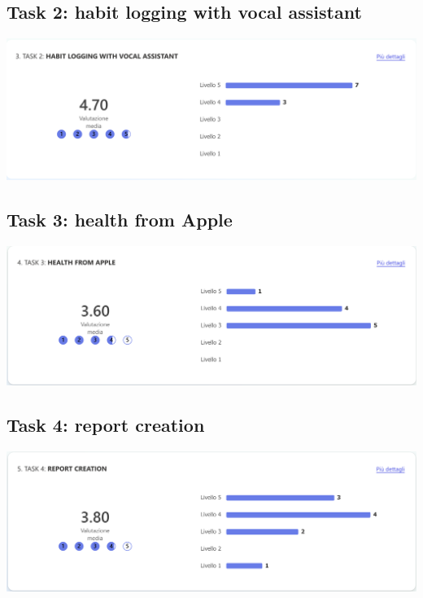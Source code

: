 \documentclass{article}
\begin{document}
\subsection{Task 2: habit logging with vocal assistant}

\begin{center}
	\includegraphics[width=\linewidth]{images/habit-logging-with-vocal-assistant-result.png}
\end{center}

\subsection{Task 3: health from Apple}

\begin{center}
	\includegraphics[width=\linewidth]{images/health-from-apple-result.png}
\end{center}

\subsection{Task 4: report creation}

\begin{center}
	\includegraphics[width=\linewidth]{images/report-creation-result.png}
\end{center}
\end{document}
